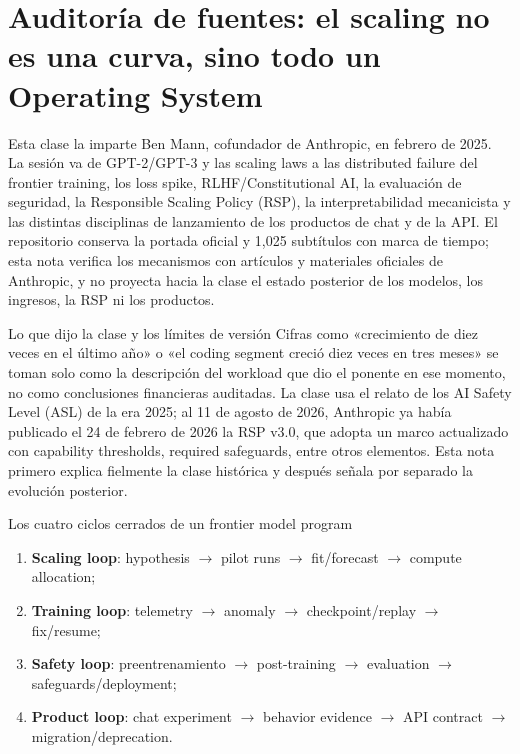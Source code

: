 \documentclass[a4paper]{article}
\begin{document}
\makecscover

\section{Auditoría de fuentes: el scaling no es una curva, sino todo un Operating System}

Esta clase la imparte Ben Mann, cofundador de Anthropic, en febrero de 2025. La sesión va de GPT-2/GPT-3 y las scaling laws a las distributed failure del frontier training, los loss spike, RLHF/Constitutional AI, la evaluación de seguridad, la Responsible Scaling Policy (RSP), la interpretabilidad mecanicista y las distintas disciplinas de lanzamiento de los productos de chat y de la API. El repositorio conserva la portada oficial y 1,025 subtítulos con marca de tiempo; esta nota verifica los mecanismos con artículos y materiales oficiales de Anthropic, y no proyecta hacia la clase el estado posterior de los modelos, los ingresos, la RSP ni los productos.

\begin{warningbox}{Lo que dijo la clase y los límites de versión}
Cifras como «crecimiento de diez veces en el último año» o «el coding segment creció diez veces en tres meses» se toman solo como la descripción del workload que dio el ponente en ese momento, no como conclusiones financieras auditadas. La clase usa el relato de los AI Safety Level (ASL) de la era 2025; al 11 de agosto de 2026, Anthropic ya había publicado el 24 de febrero de 2026 la RSP v3.0, que adopta un marco actualizado con capability thresholds, required safeguards, entre otros elementos. Esta nota primero explica fielmente la clase histórica y después señala por separado la evolución posterior.
\end{warningbox}

\begin{importantbox}{Los cuatro ciclos cerrados de un frontier model program}
\begin{enumerate}
  \item \textbf{Scaling loop}: hypothesis $\rightarrow$ pilot runs $\rightarrow$ fit/forecast $\rightarrow$ compute allocation;
  \item \textbf{Training loop}: telemetry $\rightarrow$ anomaly $\rightarrow$ checkpoint/replay $\rightarrow$ fix/resume;
  \item \textbf{Safety loop}: preentrenamiento $\rightarrow$ post-training $\rightarrow$ evaluation $\rightarrow$ safeguards/deployment;
  \item \textbf{Product loop}: chat experiment $\rightarrow$ behavior evidence $\rightarrow$ API contract $\rightarrow$ migration/deprecation.
\end{enumerate}
\end{importantbox}
\end{document}

